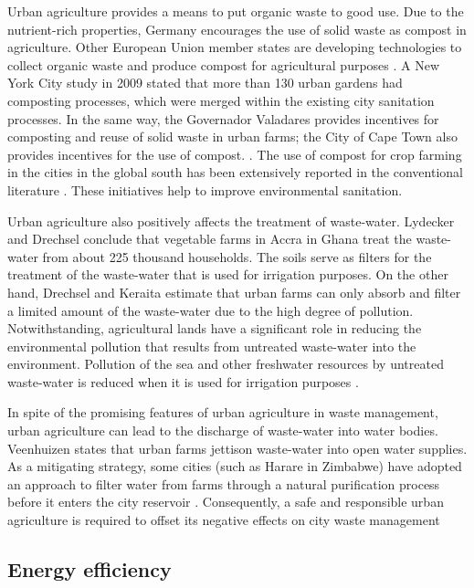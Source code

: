 Urban agriculture provides a means to put organic waste to good use. Due to the nutrient-rich properties, Germany encourages the use of solid waste as compost in agriculture. Other European Union member states are developing technologies to collect organic waste and produce compost for agricultural purposes \cite{Anastasiou2014}. A New York City study in 2009 stated that more than 130 urban gardens had composting processes, which were merged within the existing city sanitation processes. In the same way, the Governador Valadares provides incentives for composting and reuse of solid waste in urban farms; the City of Cape Town also provides incentives for the use of compost. \cite{Hoornweg2012}. The use of compost for crop farming in the cities in the global south has been extensively reported in the conventional literature \cite{Amoah2007}. These initiatives help to improve environmental sanitation.

Urban agriculture also positively affects the treatment of waste-water. Lydecker and Drechsel \cite{Lydecker2010} conclude that vegetable farms in Accra in Ghana treat the waste-water from about 225 thousand households. The soils serve as filters for the treatment of the waste-water that is used for irrigation purposes. On the other hand, Drechsel and Keraita \cite{Drechsel2014} estimate that urban farms can only absorb and filter a limited amount of the waste-water due to the high degree of pollution. Notwithstanding, agricultural lands have a significant role in reducing the environmental pollution that results from untreated waste-water into the environment. Pollution of the sea and other freshwater resources by untreated waste-water is reduced when it is used for irrigation purposes \cite{Liu2013}.

In spite of the promising features of urban agriculture in waste management, urban agriculture can lead to the discharge of waste-water into water bodies. Veenhuizen \cite{Veenhuizen} states that urban farms jettison waste-water into open water supplies. As a mitigating strategy, some cities (such as Harare in Zimbabwe) have adopted an approach to filter water from farms through a natural purification process before it enters the city reservoir \cite{Kutiwa2010}. Consequently, a safe and responsible urban agriculture is required to offset its negative effects on city waste management

\subsection{Energy efficiency}

